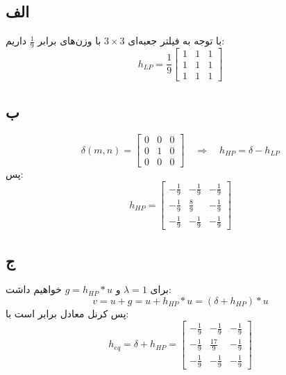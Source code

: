 \subsection*{الف}
با توجه به فیلتر جعبه‌ای $3\times 3$ با وزن‌های برابر $\frac{1}{9}$ داریم:
\[
h_{LP}=
\frac{1}{9}
\begin{bmatrix}
1&1&1\\
1&1&1\\
1&1&1
\end{bmatrix}
\]

\subsection*{ب}
\[
\delta(m,n)=
\begin{bmatrix}
0&0&0\\
0&1&0\\
0&0&0
\end{bmatrix}
\quad\Rightarrow\quad
h_{HP}=\delta-h_{LP}
\]
پس:
\[
h_{HP}=
\begin{bmatrix}
-\frac{1}{9}&-\frac{1}{9}&-\frac{1}{9}\\
-\frac{1}{9}&\frac{8}{9}&-\frac{1}{9}\\
-\frac{1}{9}&-\frac{1}{9}&-\frac{1}{9}
\end{bmatrix}
\]

\subsection*{ج}
برای $\lambda=1$ و $g=h_{HP}*u$ خواهیم داشت:
\[
v=u+g=u+h_{HP}*u=(\delta+h_{HP})*u
\]
پس کرنل معادل برابر است با:
\[
h_{eq}=\delta+h_{HP}=
\begin{bmatrix}
-\frac{1}{9}&-\frac{1}{9}&-\frac{1}{9}\\
-\frac{1}{9}&\frac{17}{9}&-\frac{1}{9}\\
-\frac{1}{9}&-\frac{1}{9}&-\frac{1}{9}
\end{bmatrix}
\]